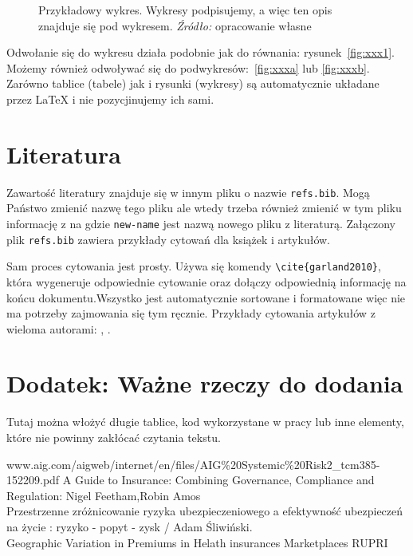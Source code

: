 \documentclass[polish, twoside, 12pt, a4paper]{article}
\theoremstyle{definition}
\theoremstyle{plain}
\theoremstyle{remark}
\begin{document}
\begin{figure}[hbt]
  \captionsetup{margin=10pt,font=small,labelfont=bf,width=.8\textwidth}

  \caption[Krótka nazwa II]{Przykładowy wykres. Wykresy podpisujemy, a więc ten opis znajduje się pod wykresem. \textit{Źródło:} opracowanie własne}\label{fig:xxx}
\end{figure}



Odwołanie się do wykresu działa podobnie jak do równania: rysunek~\ref{fig:xxx1}. Możemy również odwoływać się do podwykresów:~\ref{fig:xxxa} lub \ref{fig:xxxb}. Zarówno tablice (tabele) jak i rysunki (wykresy) są automatycznie układane przez \LaTeX{} i nie pozycjinujemy ich sami.

\clearpage
\section{Literatura}

Zawartość literatury znajduje się w innym pliku o nazwie \verb+refs.bib+. Mogą Państwo zmienić nazwę tego pliku ale wtedy trzeba również zmienić w tym pliku informację z \verb++ na \verb++ gdzie \verb+new-name+ jest nazwą nowego pliku z literaturą. Załączony plik  \verb+refs.bib+ zawiera przykłady cytowań dla książek i artykułów. 

Sam proces cytowania jest prosty. Używa się komendy \verb+\cite{garland2010}+, która wygeneruje odpowiednie cytowanie \cite{garland2010} oraz dołączy odpowiednią informację na końcu dokumentu.Wszystko jest automatycznie sortowane i formatowane więc nie ma potrzeby zajmowania się tym ręcznie. Przykłady cytowania artykułów z wieloma autorami: \cite{benaim2003}, \cite{osborne1998}. 


\appendix

\clearpage
\section{Dodatek: Ważne rzeczy do dodania}

Tutaj można włożyć długie tablice, kod wykorzystane w pracy lub inne elementy, które nie powinny zakłócać czytania tekstu.


\clearpage
www.aig.com/aigweb/internet/en/files/AIG\%20Systemic\%20Risk2\_tcm385-152209.pdf \newline
A Guide to Insurance: Combining Governance, Compliance and Regulation: Nigel Feetham,Robin Amos \\
Przestrzenne zróżnicowanie ryzyka ubezpieczeniowego a efektywność ubezpieczeń na życie : ryzyko - popyt - zysk / Adam Śliwiński. \\
Geographic Variation in Premiums in Helath insurances Marketplaces RUPRI \\
\end{document}

